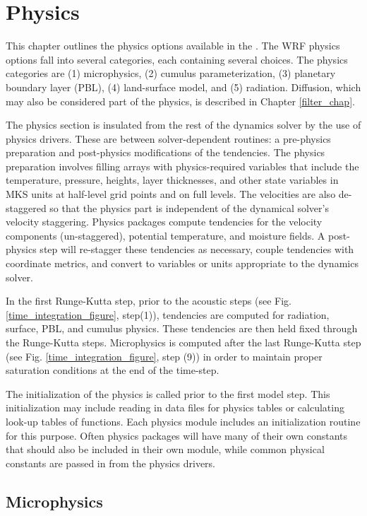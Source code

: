 \chapter{Physics}
\label{physics_chap}

This chapter
outlines the physics options available in the {\wrf}. 
The WRF physics options fall into several categories, each containing
several choices. The physics categories are (1) microphysics, 
(2) cumulus parameterization, (3) planetary boundary layer (PBL), 
(4) land-surface model, and (5) radiation. Diffusion, which
may also be considered part of the physics, 
is described in Chapter \ref{filter_chap}. 

The physics section is insulated from the rest of the dynamics solver by the 
use of physics drivers. These are between solver-dependent routines: a 
pre-physics preparation and post-physics 
modifications of the tendencies. The physics preparation involves filling
arrays with physics-required variables that include the temperature,
pressure, heights, layer thicknesses,
and other state variables in MKS units at half-level grid points and on full levels.
The velocities are also de-staggered so that the physics part is independent
of the dynamical solver's velocity staggering. Physics packages 
compute tendencies
for the velocity components (un-staggered), potential temperature, and moisture
fields. A post-physics step will re-stagger these tendencies
as necessary, couple tendencies with coordinate metrics, and convert
to variables or units appropriate to the dynamics solver.

In the first Runge-Kutta step, prior to the acoustic steps (see Fig.
\ref{time_integration_figure}, step(1)), tendencies are computed for
radiation, surface, PBL, and cumulus physics. These tendencies
are then held fixed through the Runge-Kutta steps. Microphysics is
computed after the last Runge-Kutta step 
(see Fig. \ref{time_integration_figure},
step (9)) in order to maintain proper saturation conditions at the end 
of the time-step.

The initialization of the physics is
called prior to the first model step. This initialization may include reading
in data files for physics tables or calculating look-up tables of functions.
Each physics module includes an initialization routine for this purpose.
Often physics packages will have many of their own constants that should also
be included in their own module, while common physical constants are
passed in from the physics drivers.


\section{Microphysics}

